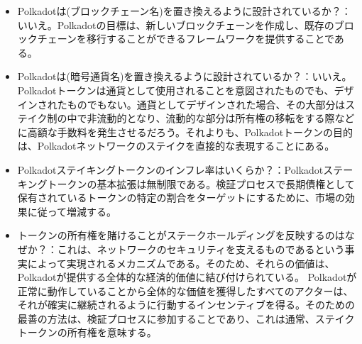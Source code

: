 \begin{itemize}
\tightlist
\item
  Polkadotは(ブロックチェーン名)を置き換えるように設計されているか？：いいえ。Polkadotの目標は、新しいブロックチェーンを作成し、既存のブロックチェーンを移行することができるフレームワークを提供することである。
\item
  Polkadotは(暗号通貨名)を置き換えるように設計されているか？：いいえ。Polkadotトークンは通貨として使用されることを意図されたものでも、デザインされたものでもない。通貨としてデザインされた場合、その大部分はステイク制の中で非流動的となり、流動的な部分は所有権の移転をする際などに高額な手数料を発生させるだろう。それよりも、Polkadotトークンの目的は、Polkadotネットワークのステイクを直接的な表現することにある。
\item
  Polkadotステイキングトークンのインフレ率はいくらか？：Polkadotステーキングトークンの基本拡張は無制限である。検証プロセスで長期債権として保有されているトークンの特定の割合をターゲットにするために、市場の効果に従って増減する。
\item
  トークンの所有権を賭けることがステークホールディングを反映するのはなぜか？：これは、ネットワークのセキュリティを支えるものであるという事実によって実現されるメカニズムである。そのため、それらの価値は、Polkadotが提供する全体的な経済的価値に結び付けられている。
  Polkadotが正常に動作していることから全体的な価値を獲得したすべてのアクターは、それが確実に継続されるように行動するインセンティブを得る。そのための最善の方法は、検証プロセスに参加することであり、これは通常、ステイクトークンの所有権を意味する。
\end{itemize}
